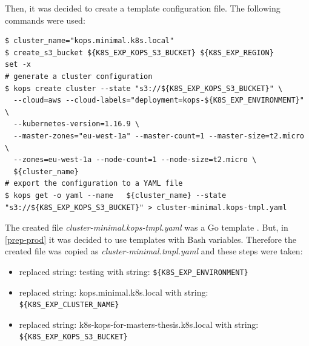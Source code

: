 Then, it was decided to create a template configuration file. The following commands were used:
\begin{lstlisting}[caption={Commands used to generate kops configuration}]
$ cluster_name="kops.minimal.k8s.local"
$ create_s3_bucket ${K8S_EXP_KOPS_S3_BUCKET} ${K8S_EXP_REGION}
set -x
# generate a cluster configuration
$ kops create cluster --state "s3://${K8S_EXP_KOPS_S3_BUCKET}" \
  --cloud=aws --cloud-labels="deployment=kops-${K8S_EXP_ENVIRONMENT}" \
  --kubernetes-version=1.16.9 \
  --master-zones="eu-west-1a" --master-count=1 --master-size=t2.micro \
  --zones=eu-west-1a --node-count=1 --node-size=t2.micro \
  ${cluster_name}
# export the configuration to a YAML file
$ kops get -o yaml --name   ${cluster_name} --state "s3://${K8S_EXP_KOPS_S3_BUCKET}" > cluster-minimal.kops-tmpl.yaml
\end{lstlisting}

The created file \textit{cluster-minimal.kops-tmpl.yaml} was a Go template \cite{online-kops-ct}. But, in \ref{prep-prod} it was decided to use templates with Bash variables. Therefore the created file was copied as \textit{cluster-minimal.tmpl.yaml} and these steps were taken:
\begin{itemize}
\item replaced string: testing with string: \verb|${K8S_EXP_ENVIRONMENT}|
\item replaced string: kops.minimal.k8s.local with string: \verb|${K8S_EXP_CLUSTER_NAME}|
\item replaced string: k8s-kops-for-masters-thesis.k8s.local with string: \verb|${K8S_EXP_KOPS_S3_BUCKET}|
\end{itemize}

